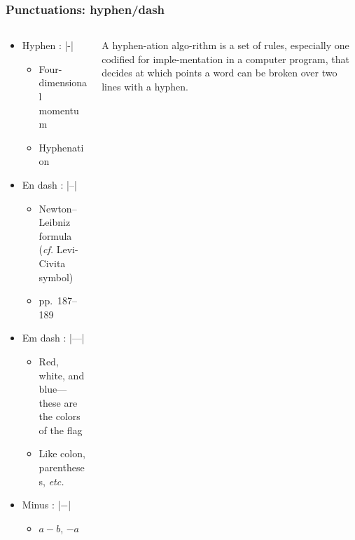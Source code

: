 \begin{frame}[fragile]
\frametitle{Punctuations: hyphen/dash}
\begin{columns}
\begin{column}{0.84\textwidth}
  \begin{itemize}
    \item<1-> Hyphen : |-|

      \begin{itemize}
        \item Four-dimensional momentum
        \item Hyphenation
      \end{itemize}

    \item<3-> En dash : |--|

      \begin{itemize}
        \item Newton--Leibniz formula (\emph{cf.} Levi-Civita symbol)
        \item pp.~187--189
      \end{itemize}

    \item<4-> Em dash : |---|

      \begin{itemize}
        \item Red, white, and blue---these are the colors of the flag
        \item Like colon, parentheses, \emph{etc.}
      \end{itemize}

    \item<5-> Minus : |$-$|

      \begin{itemize}
        \item $a-b$, $-a$
      \end{itemize}
  \end{itemize}
\end{column}
\begin{column}{0.13\textwidth}
  \tiny\RaggedRight
  A hyphen\alert{-}ation algo\alert{-}rithm is a set of rules, especially one codified
  for imple\alert{-}mentation in a computer program, that decides at which points
  a word can be broken over two lines with a hyphen.
\end{column}
\end{columns}
\end{frame}

